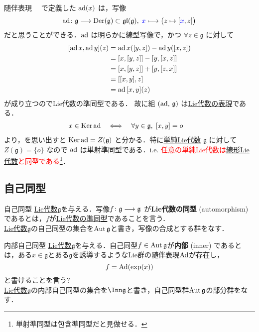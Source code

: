 \documentclass[rep_main]{subfiles}
\begin{document}
\begin{myexample}[label=def:adj-LieAlg]{随伴表現}
    　で定義した $\operatorname{ad} (x)$ は，写像
    \begin{align}
        \ad \colon \mathfrak{g} \lto \Der(\mathfrak{g}) \subset \Lgl (\mathfrak{g}),\; \textcolor{blue}{x} \lmto \bigl( z \mapsto \comm{\textcolor{blue}{x}}{z} \bigr) 
    \end{align}
    だと思うことができる．$\operatorname{ad}$ は明らかに線型写像で，かつ $\forall z \in \mathfrak{g}$ に対して
    \begin{align}
        \comm{\ad x}{\ad y}(z) &= \ad x (\comm{y}{z}) - \ad y (\comm{x}{z}) \\
        &= \comm{x}{\comm{y}{z}} - \comm{y}{\comm{x}{z}} \\
        &= \comm{x}{\comm{y}{z}} + \comm{y}{\comm{z}{x}} \\
        &= \comm{\comm{x}{y}}{z} \\
        &= \ad \comm{x}{y} (z)
    \end{align}
    が成り立つのでLie代数の準同型である．
    故に組 $(\operatorname{ad},\, \mathfrak{g})$ は\hyperref[def:rep-LieAlg]{Lie代数の表現}である．
    \begin{align}
        x \in \Ker \ad &\IFF \forall y \in \mathfrak{g},\; \comm{x}{y} = o
    \end{align}
    より，を思い出すと $\operatorname{Ker} \operatorname{ad} = Z(\mathfrak{g})$ と分かる．特に\hyperref[def:simple-LieAlg]{単純Lie代数} $\mathfrak{g}$ に対して $Z(\mathfrak{g}) = \{o\}$ なので $\operatorname{ad}$ は単射準同型である．i.e. \textcolor{red}{任意の単純Lie代数は\hyperref[def:linearLieAlg]{線形Lie代数}と同型である}\footnote{単射準同型は包含準同型だと見做せる．}．
\end{myexample}

\subsection{自己同型}

\begin{mydef}[label=def:auto-LieAlg]{自己同型}
	\hyperref[ax:LieAlg]{Lie代数}$\mathfrak{g}$を与える．写像$f \colon \mathfrak{g} \longrightarrow \mathfrak{g}$ が\textbf{Lie代数の同型} (automorphism) であるとは，$f$が\hyperref[def:hom-LieAlg]{Lie代数の準同型}であることを言う．\\
	\hyperref[ax:LieAlg]{Lie代数}$\mathfrak{g}$の自己同型の集合を$\operatorname{Aut}\mathfrak{g}$と書き，写像の合成とする群をなす．
\end{mydef}
\begin{mydef}[label=def:inner-LieAlg]{内部自己同型}
	\hyperref[ax:LieAlg]{Lie代数}$\mathfrak{g}$を与える．自己同型$f \in \operatorname{Aut}\mathfrak{g}$が\textbf{内部} (inner) であるとは，ある$x \in \mathfrak{g}$とある$\mathfrak{g}$を誘導するようなLie群の随伴表現$\operatorname{Ad}$が存在し，
	\begin{equation}
		f = \operatorname{Ad} (\exp(x))
	\end{equation}
	と書けることを言う? \\
	\hyperref[ax:LieAlg]{Lie代数}$\mathfrak{g}$の内部自己同型の集合を$\Inn\mathfrak{g}$と書き，自己同型群$\operatorname{Aut}\mathfrak{g}$の部分群をなす．
\end{mydef}
\end{document}
